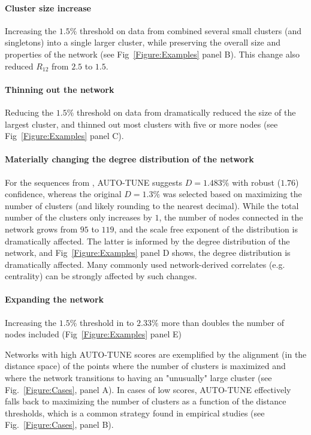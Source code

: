 \documentclass[utf8]{FrontiersinHarvard} %
\begin{document}
\paragraph{Cluster size increase}  Increasing the $1.5\%$ threshold on data from \citet{Little:2014aa} combined
several small clusters (and singletons) into a single larger cluster, while
preserving the overall size and properties of the network (see
Fig~\ref{Figure:Examples} panel B). This change also reduced $R_{12}$ from
$2.5$ to $1.5$.

\paragraph{Thinning out the network}  Reducing the $1.5\%$ threshold on data from \citet{rhee_national_2019}
dramatically reduced the size of the largest cluster, and thinned out most
clusters with five or more nodes (see Fig~\ref{Figure:Examples} panel C).

\paragraph{Materially changing the degree distribution of the network}  For the sequences from \citet{Li:2022aa}, AUTO-TUNE suggests $D = 1.483\%$ with
robust ($1.76$) confidence, whereas the original $D=1.3\%$ was selected based
on maximizing the number of clusters (and likely rounding to the nearest
decimal). While the total number of the clusters only increases by $1$, the
number of nodes connected in the network grows from $95$ to $119$, and the
scale free exponent of the distribution is dramatically affected. The latter is
informed by the degree distribution of the network, and
Fig~\ref{Figure:Examples} panel D shows, the degree distribution is
dramatically affected. Many commonly used network-derived correlates (e.g.
centrality) can be strongly affected by such changes.

\paragraph{Expanding the network}  Increasing the $1.5\%$ threshold in \citet{Billings:2019aa} to $2.33\%$ more
than doubles the number of nodes included (Fig~\ref{Figure:Examples} panel E)

Networks with high AUTO-TUNE scores are exemplified by the alignment (in the
distance space) of the points where the number of clusters is maximized and
where the network transitions to having an "unusually" large cluster (see
Fig.~\ref{Figure:Cases}, panel A). In cases of low scores, AUTO-TUNE
effectively falls back to maximizing the number of clusters as a function of
the distance thresholds, which is a common strategy found in empirical studies
(see Fig.~\ref{Figure:Cases}, panel B).
\end{document}
